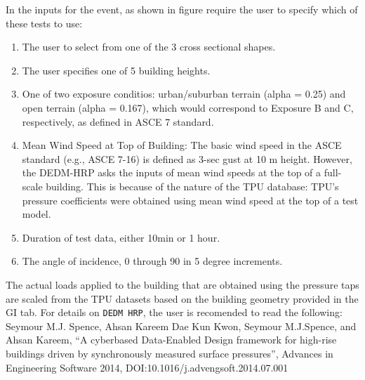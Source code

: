 In the inputs for the event, as shown in figure  require the user to specify which 
of these tests to use:
\begin{enumerate} 
\item The user to select from one of the 3 cross sectional shapes.
\item The user specifies one of 5 building heights.
\item One of two exposure conditios: urban/suburban terrain (alpha = 0.25)
and open terrain (alpha = 0.167), which would correspond to Exposure B and C, respectively, 
as defined in ASCE 7 standard.
\item Mean Wind Speed at Top of Building: The basic wind speed in the ASCE standard 
(e.g., ASCE 7-16) is defined as 3-sec gust at 10 m height. However, the DEDM-HRP asks
the inputs of mean wind speeds at the top of a full-scale building. This is because of 
the nature of the TPU database: TPU’s pressure coefficients were obtained using mean wind 
speed at the top of a test model.
\item Duration of test data, either 10min or 1 hour.
\item The angle of incidence, 0 through 90 in 5 degree increments.
\end{enumerate}

The actual loads applied to the building that are obtained using the pressure taps
are scaled from the TPU datasets based on the building geometry provided in the GI tab.
For details on \texttt{DEDM HRP}, the user is recomended to read the following:
Seymour M.J. Spence, Ahsan Kareem
Dae Kun Kwon, Seymour M.J.Spence, and Ahsan Kareem, ``A cyberbased Data-Enabled Design framework for high-rise buildings driven by synchronously measured surface pressures'', Advances in Engineering Software 2014, DOI:10.1016/j.advengsoft.2014.07.001





